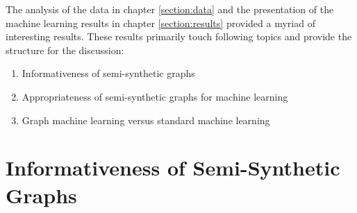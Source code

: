 
  The analysis of the data in chapter \ref{section:data} and the presentation
  of the machine learning results in chapter \ref{section:results} provided a
  myriad of interesting results. These results primarily touch following topics
  and provide the structure for the discussion:

  \begin{enumerate}
      \item Informativeness of semi-synthetic graphs
      \item Appropriateness of semi-synthetic graphs for machine learning
      \item Graph machine learning versus standard machine learning 
  \end{enumerate}

  \section{Informativeness of Semi-Synthetic Graphs}
  
